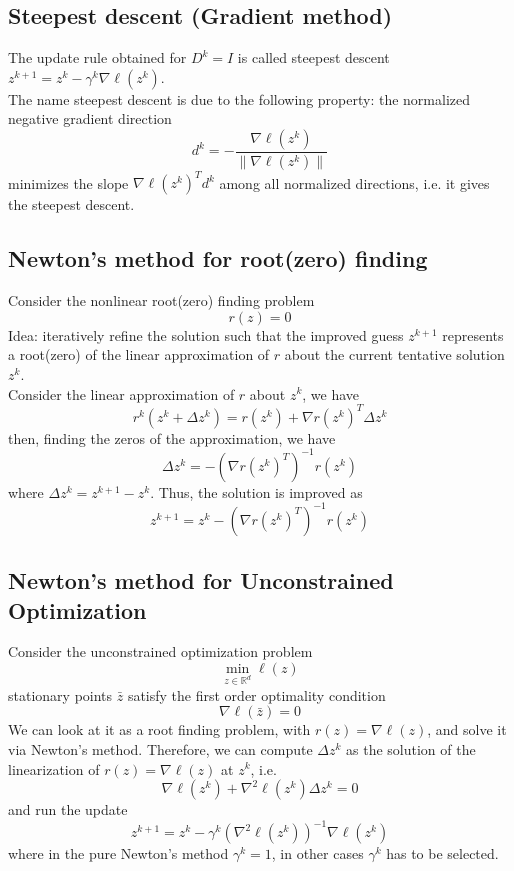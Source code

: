 \documentclass[openany]{book}
\newcommand{\R}{\mathbb{R}}               %
\theoremstyle{definition}
\theoremstyle{remark}
\begin{document}
\subsection{Steepest descent (Gradient method)}
The update rule obtained for $D^k=I$ is called steepest descent $z^{k+1} = z^k-\gamma^k\nabla\ell(z^k)$.\\
The name steepest descent is due to the following property: the normalized negative gradient direction 
\[
    d^k = -\displaystyle\frac{\nabla\ell(z^k)}{\|\nabla\ell(z^k)\|}
\]
minimizes the slope $\nabla \ell(z^k)^Td^k$ among all normalized directions, i.e. it gives the steepest descent.

\subsection{Newton's method for root(zero) finding}

Consider the nonlinear root(zero) finding problem 
\[
    r(z) = 0
\]
Idea: iteratively refine the solution such that the improved guess $z^{k+1}$ represents a root(zero) of the linear approximation of $r$ about the current tentative solution $z^k$.\\ 
Consider the linear approximation of $r$ about $z^k$, we have 
\[
    r^k(z^k+\Delta z^k) = r(z^k)+\nabla r(z^k)^T\Delta z^k
\]
then, finding the zeros of the approximation, we have
\[
    \Delta z^k = -(\nabla r(z^k)^T)^{-1}r(z^k)
\]
where $\Delta z^k = z^{k+1}-z^k$.
Thus, the solution is improved as 
\[
    z^{k+1} = z^k-(\nabla r(z^k)^T)^{-1}r(z^k)
\]

\subsection{Newton's method for Unconstrained Optimization}
Consider the unconstrained optimization problem 
\[
    \min_{z\in\R^d} \ell(z)
\]
stationary points $\bar{z}$ satisfy the first order optimality condition 
\[
    \nabla \ell (\bar{z}) = 0
\]
We can look at it as a root finding problem, with $r(z)=\nabla\ell(z)$, and solve it via Newton's method. Therefore, we can compute $\Delta z^k$ as the solution of the linearization of $r(z)=\nabla\ell(z)$ at $z^k$, i.e. 
\[
    \nabla \ell(z^k) + \nabla^2\ell(z^k)\Delta z^k = 0
\]
and run the update 
\[
    z^{k+1} = z^k -\gamma^k(\nabla^2\ell(z^k))^{-1}\nabla\ell(z^k)
\]
where in the pure Newton's method $\gamma^k=1$, in other cases $\gamma^k$ has to be selected.
\end{document}

